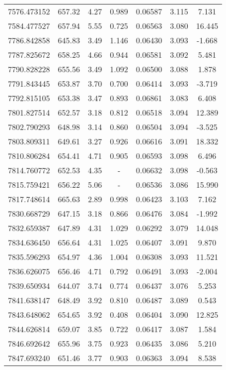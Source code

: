 \begin{table}
\begin{tabular}{ccccccc}
7576.473152 & 657.32 & 4.27 & 0.989 & 0.06587 & 3.115 & 7.131 \\
7584.477527 & 657.94 & 5.55 & 0.725 & 0.06563 & 3.080 & 16.445 \\
7786.842858 & 645.83 & 3.49 & 1.146 & 0.06430 & 3.093 & -1.668 \\
7787.825672 & 658.25 & 4.66 & 0.944 & 0.06581 & 3.092 & 5.481 \\
7790.828228 & 655.56 & 3.49 & 1.092 & 0.06500 & 3.088 & 1.878 \\
7791.843445 & 653.87 & 3.70 & 0.700 & 0.06414 & 3.093 & -3.719 \\
7792.815105 & 653.38 & 3.47 & 0.893 & 0.06861 & 3.083 & 6.408 \\
7801.827514 & 652.57 & 3.18 & 0.812 & 0.06518 & 3.094 & 12.389 \\
7802.790293 & 648.98 & 3.14 & 0.860 & 0.06504 & 3.094 & -3.525 \\
7803.809311 & 649.61 & 3.27 & 0.926 & 0.06616 & 3.091 & 18.332 \\
7810.806284 & 654.41 & 4.71 & 0.905 & 0.06593 & 3.098 & 6.496 \\
7814.760772 & 652.53 & 4.35 & - & 0.06632 & 3.098 & -0.563 \\
7815.759421 & 656.22 & 5.06 & - & 0.06536 & 3.086 & 15.990 \\
7817.748614 & 665.63 & 2.89 & 0.998 & 0.06423 & 3.103 & 7.162 \\
7830.668729 & 647.15 & 3.18 & 0.866 & 0.06476 & 3.084 & -1.992 \\
7832.659387 & 647.89 & 4.31 & 1.029 & 0.06292 & 3.079 & 14.048 \\
7834.636450 & 656.64 & 4.31 & 1.025 & 0.06407 & 3.091 & 9.870 \\
7835.596293 & 654.97 & 4.36 & 1.004 & 0.06308 & 3.093 & 11.521 \\
7836.626075 & 656.46 & 4.71 & 0.792 & 0.06491 & 3.093 & -2.004 \\
7839.650934 & 644.07 & 3.74 & 0.774 & 0.06437 & 3.076 & 5.253 \\
7841.638147 & 648.49 & 3.92 & 0.810 & 0.06487 & 3.089 & 0.543 \\
7843.648062 & 654.65 & 3.92 & 0.408 & 0.06404 & 3.090 & 12.825 \\
7844.626814 & 659.07 & 3.85 & 0.722 & 0.06417 & 3.087 & 1.584 \\
7846.692642 & 655.96 & 3.75 & 0.923 & 0.06435 & 3.086 & 5.210 \\
7847.693240 & 651.46 & 3.77 & 0.903 & 0.06363 & 3.094 & 8.538 \\

\end{tabular}
\end{table}

